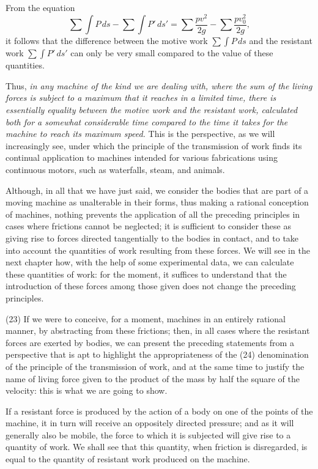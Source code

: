 \documentclass{book}
\begin{document}
From the equation \[\sum \int P \, ds - \sum \int P' \, ds' = \sum \frac{pv^2}{2g} - \sum \frac{pv_0^2}{2g},\] it follows that the difference between the motive work \(\sum \int P \, ds\) and the resistant work \(\sum \int P' \, ds'\) can only be very small compared to the value of these quantities. 

Thus, \textit{in any machine of the kind we are dealing with, where the sum of the living forces is subject to a maximum that it reaches in a limited time, there is essentially equality between the motive work and the resistant work, calculated both for a somewhat considerable time compared to the time it takes for the machine to reach its maximum speed.} This is the perspective, as we will increasingly see, under which the principle of the transmission of work finds its continual application to machines intended for various fabrications using continuous motors, such as waterfalls, steam, and animals.

Although, in all that we have just said, we consider the bodies that are part of a moving machine as unalterable in their forms, thus making a rational conception of machines, nothing prevents the application of all the preceding principles in cases where frictions cannot be neglected; it is sufficient to consider these as giving rise to forces directed tangentially to the bodies in contact, and to take into account the quantities of work resulting from these forces. We will see in the next chapter how, with the help of some experimental data, we can calculate these quantities of work: for the moment, it suffices to understand that the introduction of these forces among those given does not change the preceding principles.

(23) If we were to conceive, for a moment, machines in an entirely rational manner, by abstracting from these frictions; then, in all cases where the resistant forces are exerted by bodies, we can present the preceding statements from a perspective that is apt to highlight the appropriateness of the
\newpage
(24)
denomination of the principle of the transmission of work, and at the same time to justify the name of living force given to the product of the mass by half the square of the velocity: this is what we are going to show.

If a resistant force is produced by the action of a body on one of the points of the machine, it in turn will receive an oppositely directed pressure; and as it will generally also be mobile, the force to which it is subjected will give rise to a quantity of work. We shall see that this quantity, when friction is disregarded, is equal to the quantity of resistant work produced on the machine.
\end{document}
